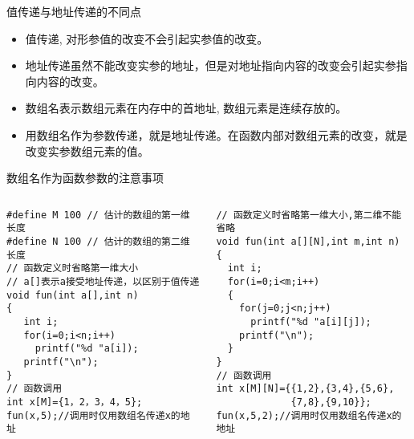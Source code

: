 \begin{frame}{值传递与地址传递的不同点}
\vspace{-0.2cm}
\begin{itemize}
	\item 值传递, 对形参值的改变不会引起实参值的改变。
	\item 地址传递虽然不能改变实参的地址，但是对地址指向内容的改变会引起实参指向内容的改变。
	\item 数组名表示数组元素在内存中的首地址, 数组元素是连续存放的。
	\item 用数组名作为参数传递，就是地址传递。在函数内部对数组元素的改变，就是改变实参数组元素的值。
\end{itemize}

\end{frame}

\begin{frame}{数组名作为函数参数的注意事项}
\vspace{-0.2cm}
\begin{columns}[T]
\begin{lstlisting}
#define M 100 // 估计的数组的第一维长度
#define N 100 // 估计的数组的第二维长度
// 函数定义时省略第一维大小
// a[]表示a接受地址传递，以区别于值传递
void fun(int a[],int n)
{
   int i;
   for(i=0;i<n;i++) 
     printf("%d "a[i]);
   printf("\n");
}
// 函数调用
int x[M]={1，2，3，4，5};
fun(x,5);//调用时仅用数组名传递x的地址
\end{lstlisting}
\begin{lstlisting}[frame=leftline]
// 函数定义时省略第一维大小,第二维不能省略
void fun(int a[][N],int m,int n)
{
  int i;
  for(i=0;i<m;i++)
  {
    for(j=0;j<n;j++) 
      printf("%d "a[i][j]);
    printf("\n");
  }
}
// 函数调用
int x[M][N]={{1,2},{3,4},{5,6},
             {7,8},{9,10}};
fun(x,5,2);//调用时仅用数组名传递x的地址
\end{lstlisting}
\end{columns}
~\\
\end{frame}

